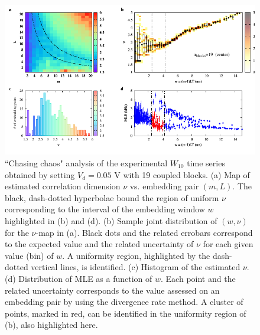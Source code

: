 \begin{figure}[H]
    \centering
    \includegraphics[width=\linewidth]{../blocks/19_blocks/middle/2e5_points/plots/chaos_low.pdf}
    \caption{``Chasing chaos" analysis of the experimental $W_{10}$ time series obtained by setting $V_d=0.05$ V with 19 coupled blocks.
    (a) Map of estimated correlation dimension $\nu$ vs. embedding pair $(m, L)$.
    The black, dash-dotted hyperbolae bound the region of uniform $\nu$ corresponding to the interval of the
    embedding window $w$ highlighted in (b) and (d).
    (b) Sample joint distribution of $(w,\nu)$ for the $\nu$-map in (a).
    Black dots and the related errobars correspond to the expected value and the related uncertainty of $\nu$
    for each given value (bin) of $w$. A uniformity region, highlighted by the dash-dotted vertical lines,
    is identified. (c) Histogram of the estimated $\nu$. (d) Distribution of MLE as a function of $w$. Each point and the related
    uncertainty corresponds to the value assessed on an embedding pair by using the divergence rate method.
    A cluster of points, marked in red, can be identified in the uniformity region of (b), also highlighted here.}
    \label{fig:19 blocks chaos middle}
\end{figure}


